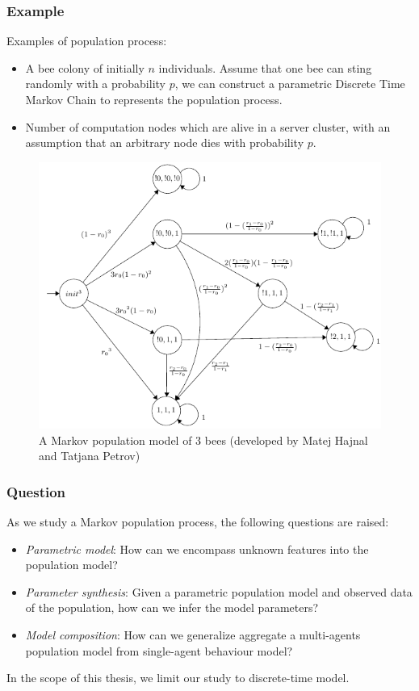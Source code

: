 \documentclass{beamer}
\begin{document}
\begin{frame}
  \frametitle{Example}
  Examples of population process:
  \begin{itemize}
  \item A bee colony of initially $n$ individuals. Assume that one bee can sting
    randomly with a probability $p$, we can construct a parametric Discrete
    Time Markov Chain to represents the population process.
  \item Number of computation nodes which are alive in a server cluster, with an
    assumption that an arbitrary node dies with probability $p$. 
  \end{itemize}
  \begin{figure}[t]
    \includegraphics[height=0.5\textheight]{3bees.png} \centering
    \caption{A Markov population model of 3 bees (developed by Matej Hajnal and
      Tatjana Petrov)}
  \end{figure}
\end{frame}

\begin{frame}
  \frametitle{Question}
  As we study a Markov population process, the following questions are raised:
  \begin{itemize}
  \item \textit{Parametric model}: How can we encompass unknown features into
    the population model?
  \item \textit{Parameter synthesis}: Given a parametric population model and
    observed data of the population, how can we infer the model parameters?
  \item \textit{Model composition}: How can we generalize aggregate a
    multi-agents population model from single-agent behaviour model?
  \end{itemize} 
  In the scope of this thesis, we limit our study to discrete-time model.
\end{frame}
\end{document}
